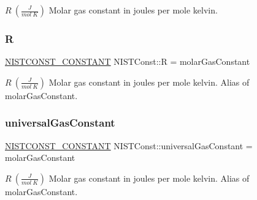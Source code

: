 $R \ (\frac{J}{mol\ K})$ Molar gas constant in joules per mole kelvin. \mbox{\label{group___n_i_s_t_const-_molar_gas_constant_ga5396aa5ee203cc91bc415c59c14a79a3}} 
\subsubsection{\texorpdfstring{R}{R}}
{\footnotesize\ttfamily \mbox{\hyperlink{group___n_i_s_t_const-_macros_ga2b0fc1d7452373f816175dd86ce26729}{N\+I\+S\+T\+C\+O\+N\+S\+T\+\_\+\+C\+O\+N\+S\+T\+A\+NT}} N\+I\+S\+T\+Const\+::R = molar\+Gas\+Constant}

$R \ (\frac{J}{mol\ K})$ Molar gas constant in joules per mole kelvin. Alias of molar\+Gas\+Constant. \mbox{\label{group___n_i_s_t_const-_molar_gas_constant_ga308d88479aad38c599c72dfca8a7b14f}} 
\subsubsection{\texorpdfstring{universal\+Gas\+Constant}{universalGasConstant}}
{\footnotesize\ttfamily \mbox{\hyperlink{group___n_i_s_t_const-_macros_ga2b0fc1d7452373f816175dd86ce26729}{N\+I\+S\+T\+C\+O\+N\+S\+T\+\_\+\+C\+O\+N\+S\+T\+A\+NT}} N\+I\+S\+T\+Const\+::universal\+Gas\+Constant = molar\+Gas\+Constant}

$R \ (\frac{J}{mol\ K})$ Molar gas constant in joules per mole kelvin. Alias of molar\+Gas\+Constant. 